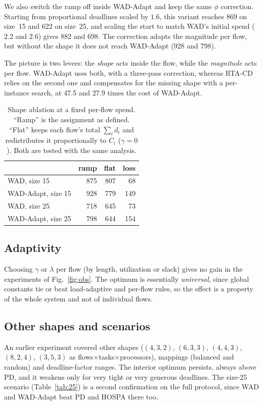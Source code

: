 \documentclass[conference]{IEEEtran}
\begin{document}
We also switch the ramp off inside WAD-Adapt and keep the same $\phi$
correction. Starting from proportional deadlines scaled by $1.6$, this variant
reaches 869 on size~15 and 622 on size~25, and scaling the start to match WAD's
initial spend ($2.2$ and $2.6$) gives 882 and 698. The correction adapts the
magnitude per flow, but without the shape it does not reach WAD-Adapt (928 and
798).

The picture is two levers: the \emph{shape} acts inside the flow, while the
\emph{magnitude} acts per flow. WAD-Adapt uses both, with a three-pass correction,
whereas RTA-CD relies on the second one and compensates for the missing shape with
a per-instance search, at 47.5 and 27.9 times the cost of WAD-Adapt.

\begin{table}[t]
\centering
\caption{Shape ablation at a fixed per-flow spend. ``Ramp'' is the assignment as
defined. ``Flat'' keeps each flow's total $\sum_i d_i$ and redistributes it
proportionally to $C_i$ ($\gamma=0$). Both are tested with the same analysis.}
\label{tab:shape_ablation}
\begin{tabular}{lrrr}
\toprule
 & ramp & flat & loss \\
\midrule
WAD, size 15          & 875 & 807 & 68 \\
WAD-Adapt, size 15    & 928 & 779 & 149 \\
WAD, size 25          & 718 & 645 & 73 \\
WAD-Adapt, size 25    & 798 & 644 & 154 \\
\bottomrule
\end{tabular}
\end{table}

\subsection{Adaptivity}
Choosing $\gamma$ or $\lambda$ per flow (by length, utilization or slack) gives
no gain in the experiments of Fig.~\ref{fig:obs}. The optimum is essentially
\emph{universal}, since global constants tie or beat load-adaptive and per-flow
rules, so the effect is a property of the whole system and not of individual
flows.

\subsection{Other shapes and scenarios}
An earlier experiment covered other shapes ($(4,3,2)$, $(6,3,3)$, $(4,4,3)$,
$(8,2,4)$, $(3,5,3)$ as flows$\times$tasks$\times$processors), mappings (balanced
and random) and deadline-factor ranges. The interior optimum persists, always
above PD, and it weakens only for very tight or very generous deadlines. The
size-25 scenario (Table~\ref{tab:25}) is a second confirmation on the full
protocol, since WAD and WAD-Adapt beat PD and HOSPA there too.
\end{document}
